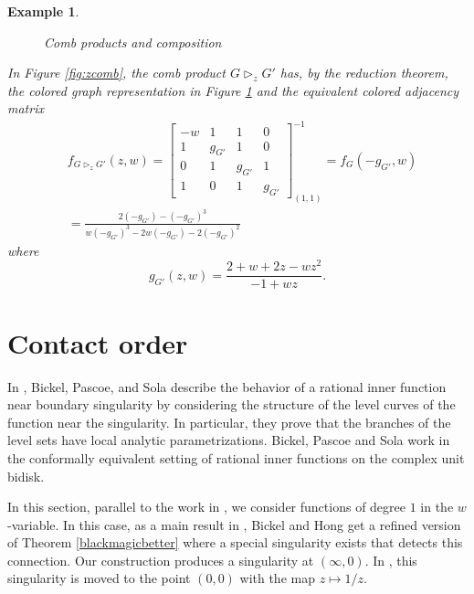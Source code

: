 \documentclass[12pt]{amsart}
\newtheorem{example}[theorem]{Example}
\theoremstyle{remark}
\newcommand{\inv}{^{-1}}
\newcommand\bbm{\begin{bmatrix}}
\newcommand\ebm{\end{bmatrix}}
\numberwithin{equation}{section}
\newcommand{\comb}{\triangleright}
\begin{document}
\begin{example}
\begin{figure}[!htbp]
\begin{tikzpicture} [scale=.7,auto=center, every node/.style={circle,fill=blue!20}]
    
    \end{tikzpicture}
        \caption{Comb products and composition}
        \label{fig:combex}
\end{figure}
In Figure \ref{fig:zcomb}, the comb product $G \comb_z G'$ has, by the reduction theorem, the colored graph representation in Figure \ref{fig:combex} and the equivalent colored adjacency matrix
\begin{align*}
&f_{G \comb_z G'} (z, w) = \bbm -w & 1 & 1 & 0 \\ 1&  g_{G'}& 1& 0 \\ 0& 1& g_{G'}& 1 \\ 1& 0& 1& g_{G'} \ebm\inv_{(1,1)} = f_G(-g_{G'}, w) \\
&= \frac{2 (-g_{G'})-(-g_{G'})^3}{w (-g_{G'})^3-2 w (-g_{G'})-2 (-g_{G'})^2}
\end{align*}
where
\[
g_{G'}(z,w) = \frac{2 + w + 2 z - w z^2}{-1 + w z}.
\]
\end{example}





    

 
\section{Contact order}



In \cite{bps1, bps2}, Bickel, Pascoe, and Sola describe the behavior of a rational inner function near boundary singularity by considering the structure of the level curves of the function near the singularity. In particular, they prove that the branches of the level sets have local analytic parametrizations. Bickel, Pascoe and Sola work in the conformally equivalent setting of rational inner functions on the complex unit bidisk. 


In this section, parallel to the work in \cite{bickelhong}, we consider functions of degree $1$ in the $w$-variable. In this case, as a main result in \cite{bickelhong}, Bickel and Hong get a refined version of Theorem \ref{blackmagicbetter} where a special singularity exists that detects this connection. Our construction produces a singularity at $(\infty, 0)$. In \cite{bickelhong}, this singularity is moved to the point $(0,0)$ with the map $z \mapsto 1/z$.
\end{document}
